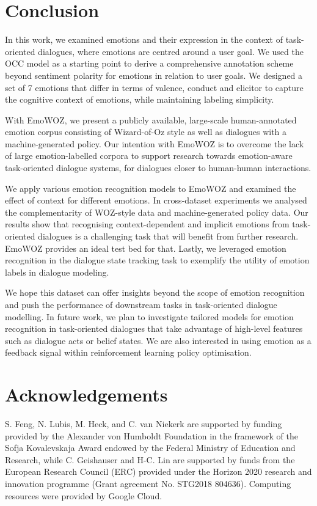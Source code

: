 \documentclass[10pt, a4paper]{article}
\begin{document}
\section{Conclusion}









In this work, we examined emotions and their expression in the context of task-oriented dialogues, where emotions are centred around a user goal. We used the OCC model as a starting point to derive a comprehensive annotation scheme beyond sentiment polarity for emotions in relation to user goals. We designed a set of 7 emotions that differ in terms of valence, conduct and elicitor to capture the cognitive context of emotions, while maintaining labeling simplicity. 


With EmoWOZ, we present a publicly available, large-scale human-annotated emotion corpus consisting of Wizard-of-Oz style as well as dialogues with a machine-generated policy. Our intention with EmoWOZ is to overcome the lack of large emotion-labelled corpora to support research towards emotion-aware task-oriented dialogue systems, for dialogues closer to human-human interactions.

We apply various emotion recognition models to EmoWOZ and examined the effect of context for different emotions. In cross-dataset experiments we analysed the complementarity of WOZ-style data and machine-generated policy data. Our results show that recognising context-dependent and implicit emotions from task-oriented dialogues is a challenging task that will benefit from further research. EmoWOZ provides an ideal test bed for that. Lastly, we leveraged emotion recognition in the dialogue state tracking task to exemplify the utility of emotion labels in dialogue modeling. 

We hope this dataset can offer insights beyond the scope of emotion recognition and push the performance of downstream tasks in task-oriented dialogue modelling. In future work, we plan to investigate tailored models for emotion recognition in task-oriented dialogues that take advantage of high-level features such as dialogue acts or belief states. We are also interested in using emotion as a feedback signal within reinforcement learning policy optimisation.


\section{Acknowledgements}
S. Feng, N. Lubis, M. Heck, and C. van Niekerk are supported by funding provided by the Alexander von Humboldt Foundation in the framework of the Sofja Kovalevskaja Award endowed by the Federal Ministry of Education and Research, while C. Geishauser and H-C. Lin are supported by funds from the European Research Council (ERC) provided under the Horizon 2020 research and innovation programme (Grant agreement No. STG2018 804636). Computing resources were provided by Google Cloud.
\newpage
\end{document}
